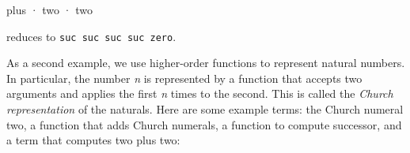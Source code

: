 \begin{myDisplay}
plus · two · two
\end{myDisplay}

reduces to
\texttt{\textasciigrave{}suc\ \textasciigrave{}suc\ \textasciigrave{}suc\ \textasciigrave{}suc\ \textasciigrave{}zero}.

As a second example, we use higher-order functions to represent natural
numbers. In particular, the number \emph{n} is represented by a function
that accepts two arguments and applies the first \emph{n} times to the
second. This is called the \emph{Church representation} of the naturals.
Here are some example terms: the Church numeral two, a function that
adds Church numerals, a function to compute successor, and a term that
computes two plus two:

\begin{fence}
\begin{code}%
\>[0]\AgdaSpace{}%
\AgdaSymbol{:}\AgdaSpace{}%
\<%
\\
\>[0]\AgdaSpace{}%
\AgdaSymbol{=}%
\>[8]\AgdaSpace{}%
\AgdaSpace{}%
\AgdaSpace{}%
\AgdaSpace{}%
\AgdaSpace{}%
\AgdaSpace{}%
\AgdaSpace{}%
\AgdaSpace{}%
\AgdaSpace{}%
\AgdaSymbol{(}\AgdaSpace{}%
\AgdaSpace{}%
\AgdaSpace{}%
\AgdaSpace{}%
\AgdaSymbol{)}\<%
\\
%
\\[\AgdaEmptyExtraSkip]%
\>[0]\AgdaSpace{}%
\AgdaSymbol{:}\AgdaSpace{}%
\<%
\\
\>[0]\AgdaSpace{}%
\AgdaSymbol{=}%
\>[9]\AgdaSpace{}%
\AgdaSpace{}%
\AgdaSpace{}%
\AgdaSpace{}%
\AgdaSpace{}%
\AgdaSpace{}%
\AgdaSpace{}%
\AgdaSpace{}%
\AgdaSpace{}%
\AgdaSpace{}%

\end{code}
\end{fence}
